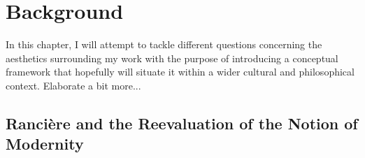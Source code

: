 \chapter{Background}

In this chapter, I will attempt to tackle different questions concerning the aesthetics surrounding my work with the purpose of introducing a conceptual framework that hopefully will situate it within a wider cultural and philosophical context. Elaborate a bit more...


\section{Ranci\`{e}re and the Reevaluation of the \mbox{Notion} of Modernity}


